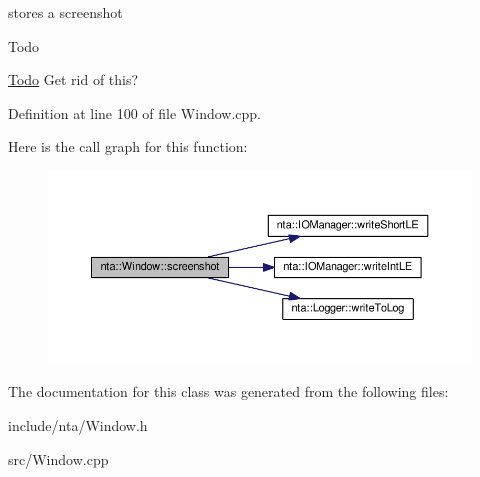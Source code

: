 stores a screenshot 

\begin{DoxyRefDesc}{Todo}
\item[\hyperlink{todo__todo000029}{Todo}]Get rid of this? \end{DoxyRefDesc}


Definition at line 100 of file Window.\+cpp.

Here is the call graph for this function\+:\nopagebreak
\begin{figure}[H]
\begin{center}
\leavevmode
\includegraphics[width=350pt]{d4/dfb/classnta_1_1Window_aa144f6bb014aaad3c91c3f3e6ad56f9c_cgraph}
\end{center}
\end{figure}


The documentation for this class was generated from the following files\+:\begin{DoxyCompactItemize}
\item 
include/nta/Window.\+h\item 
src/Window.\+cpp\end{DoxyCompactItemize}
